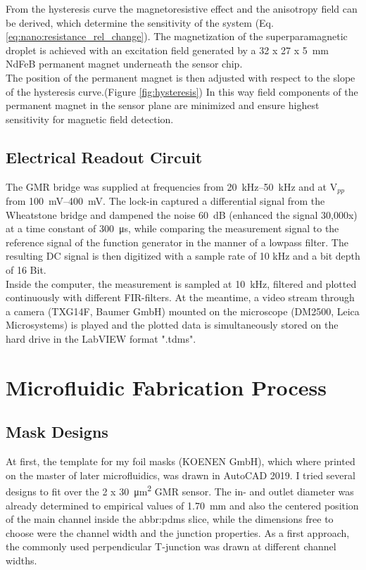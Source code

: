 \newpage
From the hysteresis curve the magnetoresistive effect and the anisotropy field can be derived, which determine the sensitivity of the system (Eq. \ref{eq:nano:resistance_rel_change}). 
The magnetization of the superparamagnetic droplet is achieved with an excitation field generated by a 32 x 27 x \SI{5}{\mm} NdFeB permanent magnet underneath the sensor chip.\\The position of the permanent magnet is then adjusted with respect to the slope of the hysteresis curve.(Figure \ref{fig:hysteresis}) In this way field components of the permanent magnet in the sensor plane are minimized and ensure highest sensitivity for magnetic field detection.\cite{lit:Helou}
\subsection*{Electrical Readout Circuit}
The GMR bridge was supplied at frequencies from \SIrange{20}{50}{\kHz} and at V$_{pp}$ from \SIrange{100}{400}{\mV}. The lock-in captured a differential signal from the Wheatstone bridge and dampened the noise \SI{60}{\dB} (enhanced the signal 30,000x) at a time constant of \SI{300}{\micro\second}, while comparing the measurement signal to the reference signal of the function generator in the manner of a lowpass filter. The resulting DC signal is then digitized with a sample rate of 10 kHz and a bit depth of 16 Bit.\\ Inside the computer, the measurement is sampled at \SI{10}{\kHz}, filtered and plotted continuously with different FIR-filters. At the meantime, a video stream through a camera (TXG14F, Baumer GmbH) mounted on the microscope (DM2500, Leica Microsystems) is played and the plotted data is simultaneously stored on the hard drive in the LabVIEW format ".tdms".
\newpage
\section{Microfluidic Fabrication Process}
\subsection{Mask Designs}
At first, the template for my foil masks (KOENEN GmbH), which where printed on the master of later microfluidics, was drawn in AutoCAD 2019. I tried several designs to fit over the 2 x \SI{30}{\micro\meter\squared} GMR sensor. The in- and outlet diameter was already determined to empirical values of \SI{1.70}{\mm} and also the centered position of the main channel inside the \acrfull{abbr:pdms} slice, while the dimensions free to choose were the channel width and the junction properties. As a first approach, the commonly used perpendicular T-junction was drawn at different channel widths.

